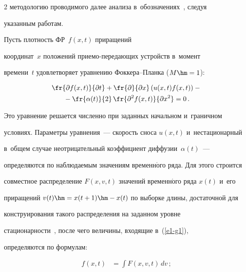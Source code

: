 \begin{multicols}{2}
методологию проводимого далее анализа в~обозначениях~\cite{14-g1}, следуя 


указанным работам.


  


  Пусть плотность ФР~$f(x,t)$ приращений 


координат~$x$ положений при\-емо-пе\-ре\-да\-ющих устройств в~момент 


времени~$t$ удовле\-тво\-ря\-ет уравнению Фок\-ке\-ра--План\-ка ($M\hm=1$):


  \begin{multline}


  \fr{\partial f(x,t)}{\partial t} +\fr{\partial}{\partial x}\left( u(x,t) 


  f(x,t)\right)- {}\\


  {}-


\fr{\alpha(t)}{2} \,\fr{\partial^2 f(x,t)}{\partial x^2}=0\,.


  \label{e1-g1}


  \end{multline}


  


  Это уравнение решается численно при заданных начальном и~граничном 


условиях. Параметры уравнения~--- скорость сноса $u(x,t)$ и~нестационарный 


в~общем случае неотрицательный коэффициент диффузии~$\alpha(t)$~--- 


определяются по наблюдаемым значениям временн$\acute{\mbox{о}}$го ряда. Для этого строится 


совместное распределение $F(x,v,t)$ значений временн$\acute{\mbox{о}}$го ряда $x(t)$ и~его 


приращений $v(t)\hm= x(t+1)\hm- x(t)$ по выборке длины, достаточной для 


конструирования такого распределения на заданном уровне 


стационарности~\cite{17-g1}, после чего величины, входящие в~(\ref{e1-g1}), 


определяются по формулам:





\noindent


  \begin{align*}


    f(x,t) &=\displaystyle \int F(x,v,t)\,dv\,;\\



\end{align*}
\end{multicols}
